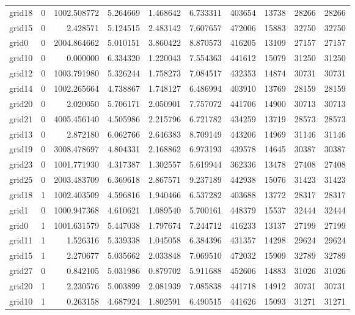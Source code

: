 \begin{longtable}{|l|r|r|r|r|r|r|r|r|r|}
grid18 & 0 & 1002.508772 & 5.264669 & 1.468642 & 6.733311 & 403654 & 13738 & 28266 & 28266 \\
grid15 & 0 & 2.428571 & 5.124515 & 2.483142 & 7.607657 & 472006 & 15883 & 32750 & 32750 \\
grid0 & 0 & 2004.864662 & 5.010151 & 3.860422 & 8.870573 & 416205 & 13109 & 27157 & 27157 \\
grid10 & 0 & 0.000000 & 6.334320 & 1.220043 & 7.554363 & 441612 & 15079 & 31250 & 31250 \\
grid12 & 0 & 1003.791980 & 5.326244 & 1.758273 & 7.084517 & 432353 & 14874 & 30731 & 30731 \\
grid14 & 0 & 1002.265664 & 4.738867 & 1.748127 & 6.486994 & 403910 & 13769 & 28159 & 28159 \\
grid20 & 0 & 2.020050 & 5.706171 & 2.050901 & 7.757072 & 441706 & 14900 & 30713 & 30713 \\
grid21 & 0 & 4005.456140 & 4.505986 & 2.215796 & 6.721782 & 434259 & 13719 & 28573 & 28573 \\
grid13 & 0 & 2.872180 & 6.062766 & 2.646383 & 8.709149 & 443206 & 14969 & 31146 & 31146 \\
grid19 & 0 & 3008.478697 & 4.804331 & 2.168862 & 6.973193 & 439578 & 14645 & 30387 & 30387 \\
grid23 & 0 & 1001.771930 & 4.317387 & 1.302557 & 5.619944 & 362336 & 13478 & 27408 & 27408 \\
grid25 & 0 & 2003.483709 & 6.369618 & 2.867571 & 9.237189 & 442938 & 15076 & 31423 & 31423 \\
grid18 & 1 & 1002.403509 & 4.596816 & 1.940466 & 6.537282 & 403688 & 13772 & 28317 & 28317 \\
grid1 & 0 & 1000.947368 & 4.610621 & 1.089540 & 5.700161 & 448379 & 15537 & 32444 & 32444 \\
grid0 & 1 & 1001.631579 & 5.447038 & 1.797674 & 7.244712 & 416233 & 13137 & 27199 & 27199 \\
grid11 & 1 & 1.526316 & 5.339338 & 1.045058 & 6.384396 & 431357 & 14298 & 29624 & 29624 \\
grid15 & 1 & 2.270677 & 5.035662 & 2.033848 & 7.069510 & 472032 & 15909 & 32789 & 32789 \\
grid27 & 0 & 0.842105 & 5.031986 & 0.879702 & 5.911688 & 452606 & 14883 & 31026 & 31026 \\
grid20 & 1 & 2.230576 & 5.003899 & 2.081939 & 7.085838 & 441718 & 14912 & 30731 & 30731 \\
grid10 & 1 & 0.263158 & 4.687924 & 1.802591 & 6.490515 & 441626 & 15093 & 31271 & 31271 \\

\end{longtable}
